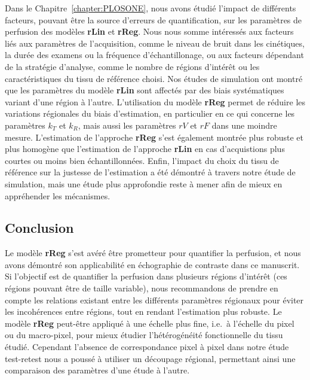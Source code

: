 \begin{otherlanguage}{francais}
Dans le Chapitre~\ref{chapter:PLOSONE}, nous avons \'etudi\'e l'impact de diff\'erents facteurs, pouvant \^etre la source d'erreurs de quantification, sur les param\`etres de perfusion des mod\`eles \textbf{rLin} et \textbf{rReg}.
Nous nous somme int\'eress\'es aux facteurs li\'es aux param\`etres de l'acquisition, comme le niveau de bruit dans les cin\'etiques, la dur\'ee des examens ou la fr\'equence d'\'echantillonage, ou aux facteurs d\'ependant de la strat\'egie d'analyse, comme le nombre de r\'egions d'int\'er\^et ou les caract\'eristiques du tissu de r\'ef\'erence choisi.
Nos \'etudes de simulation ont montr\'e que les param\`etres du mod\`ele \textbf{rLin} sont affect\'es par des biais syst\'ematiques variant d'une r\'egion \`a l'autre.
L'utilisation du mod\`ele \textbf{rReg} permet de r\'eduire les variations r\'egionales du biais d'estimation, en particulier en ce qui concerne les param\`etres $k_T$ et $k_R$, mais aussi les param\`etres $rV$ et $rF$
dans une moindre mesure.
L'estimation de l'approche \textbf{rReg} s'est \'egalement montr\'ee plus robuste et plus homog\`ene que l'estimation de l'approche \textbf{rLin} en cas d'acquistions plus courtes ou moins bien \'echantillonn\'ees.
Enfin, l'impact du choix du tissu de r\'ef\'erence sur la justesse de l'estimation a \'et\'e d\'emontr\'e \`a travers notre \'etude de simulation, mais une \'etude plus approfondie reste \`a mener afin de mieux en appr\'ehender les m\'ecanismes.

\subsection*{Conclusion}
Le mod\`ele \textbf{rReg} s'est av\'er\'e \^etre prometteur pour quantifier la perfusion, et nous avons d\'emontr\'e son applicabilit\'e en \'echographie de contraste dans ce manuscrit.
Si l'objectif est de quantifier la perfusion dans plusieurs r\'egions d'int\'er\^et (ces r\'egions pouvant \^etre de taille variable), nous recommandons de prendre en compte les relations existant entre les diff\'erents param\`etres r\'egionaux pour \'eviter les incoh\'erences entre r\'egions, tout en rendant l'estimation plus robuste.
Le mod\`ele \textbf{rReg} peut-\^etre appliqu\'e \`a une \'echelle plus fine, i.e.~\`a l'\'echelle du pixel ou du macro-pixel, pour mieux \'etudier l'h\'et\'erog\'en\'eit\'e fonctionnelle du tissu \'etudi\'e.
Cependant l'absence de correspondance pixel \`a pixel dans notre \'etude test-retest nous a pouss\'e \`a utiliser un d\'ecoupage r\'egional, permettant ainsi une comparaison des param\`etres d'une \'etude \`a l'autre.


\end{otherlanguage}
